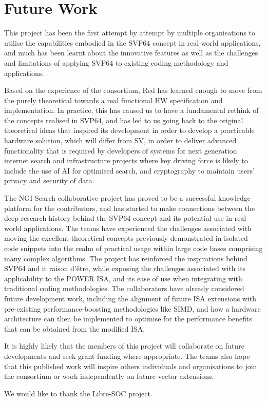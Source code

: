 \section{Future Work}

This project has been the first attempt by attempt by multiple organisations
to utilise the capabilities embodied in the \acrshort{SVP64} concept in real-world
applications, and much has been learnt about the innovative features as well
as the challenges and limitations of applying \acrshort{SVP64} to existing
coding methodology and applications.

Based on the experience of the consortium, Red has learned enough to move from
the purely theoretical towards a real functional HW specification
and implementation.
In practice, this has caused us to have a fundamental rethink of the concepts
realised in \acrshort{SVP64}, and has led to us going back to the original theoretical
ideas that inspired its development in order to develop a practicable hardware
solution, which will differ from \acrshort{SV}, in order to deliver
advanced functionality that is required by developers of systems for next
generation internet search and infrastructure projects where key driving force
is likely to include the use of AI for optimised search, and cryptography to
maintain users' privacy and security of data.

The \acrshort{NGI} Search collaborative project has proved to be a successful knowledge
platform for the contributors, and has started to make connections between the
deep research history behind the \acrshort{SVP64} concept and its potential use in
real-world applications. The teams have experienced the challenges associated
with moving the excellent theoretical concepts previously demonstrated in
isolated code snippets into the realm of practical usage within large code
bases comprising many complex algorithms. The project has reinforced the
inspirations behind \acrshort{SVP64} and it raison d’être, while exposing the challenges
associated with its applicability to the \acrshort{POWER} \acrshort{ISA}, and its ease of use when
integrating with traditional coding methodologies. The collaborators have
already considered future development work, including the alignment of future
\acrshort{ISA} extensions with pre-existing performance-boosting methodologies like \acrshort{SIMD},
and how a hardware architecture can then be implemented to optimise for the
performance benefits that can be obtained from the modified \acrshort{ISA}.

It is highly likely that the members of this project will collaborate on future
developments and seek grant funding where appropriate. The teams also hope that
this published work will inspire others individuals and organisations to join
the consortium or work independently on future vector extensions.

We would like to thank the Libre-SOC project.
